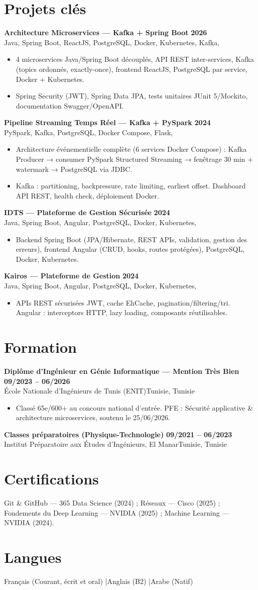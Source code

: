 \documentclass[a4paper,10pt]{article}
\newcommand{\cventry}[4]{\textbf{#1} \hfill \textbf{#4}\\[0.5pt]#2{\ifx\relax#3\relax\else, #3\fi}\par\vspace{1pt}}
\begin{document}
\section{Projets clés}
\cventry{Architecture Microservices --- Kafka + Spring Boot}{Java, Spring Boot, ReactJS, PostgreSQL, Docker, Kubernetes, Kafka}{}{2026}
\begin{itemize}
  \item 4 microservices Java/Spring Boot découplés, API REST inter-services, Kafka (topics ordonnés, exactly-once), frontend ReactJS, PostgreSQL par service, Docker + Kubernetes.
  \item Spring Security (JWT), Spring Data JPA, tests unitaires JUnit 5/Mockito, documentation Swagger/OpenAPI.
\end{itemize}
\cventry{Pipeline Streaming Temps Réel --- Kafka + PySpark}{PySpark, Kafka, PostgreSQL, Docker Compose, Flask}{}{2024}
\begin{itemize}
  \item Architecture événementielle complète (6 services Docker Compose) : Kafka Producer → consumer PySpark Structured Streaming → fenêtrage 30 min + watermark → PostgreSQL via JDBC.
  \item Kafka : partitioning, backpressure, rate limiting, earliest offset. Dashboard API REST, health check, déploiement Docker.
\end{itemize}
\cventry{IDTS --- Plateforme de Gestion Sécurisée}{Java, Spring Boot, Angular, PostgreSQL, Docker, Kubernetes}{}{2024}
\begin{itemize}
  \item Backend Spring Boot (JPA/Hibernate, REST APIs, validation, gestion des erreurs), frontend Angular (CRUD, hooks, routes protégées), PostgreSQL, Docker, Kubernetes.
\end{itemize}
\cventry{Kairos --- Plateforme de Gestion}{Java, Spring Boot, Angular, PostgreSQL, Docker, Kubernetes}{}{2024}
\begin{itemize}
  \item APIs REST sécurisées JWT, cache EhCache, pagination/filtering/tri. Angular : interceptors HTTP, lazy loading, composants réutilisables.
\end{itemize}
\section{Formation}
\cventry{Diplôme d'Ingénieur en Génie Informatique --- Mention Très Bien}{École Nationale d'Ingénieurs de Tunis (ENIT)}{Tunisie}{09/2023 -- 06/2026}
\begin{itemize}
  \item Classé 65e/600+ au concours national d'entrée. PFE : Sécurité applicative \& architecture microservices, soutenu le 25/06/2026.
\end{itemize}
\cventry{Classes préparatoires (Physique-Technologie)}{Institut Préparatoire aux Études d'Ingénieurs, El Manar}{Tunisie}{09/2021 -- 06/2023}
\section{Certifications}
Git \& GitHub --- 365 Data Science (2024) ; Réseaux --- Cisco (2025) ; Fondements du Deep Learning --- NVIDIA (2025) ; Machine Learning --- NVIDIA (2024).
\section{Langues}
Français (Courant, écrit et oral) \quad|\quad Anglais (B2) \quad|\quad Arabe (Natif)
\end{document}
